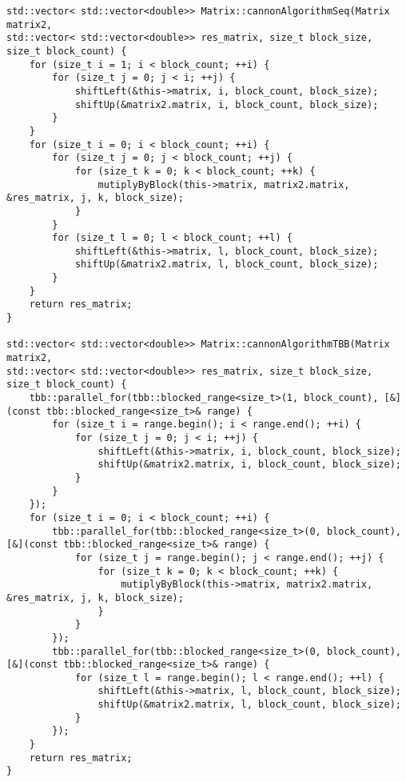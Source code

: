\documentclass{report}
\begin{document}
\begin{lstlisting}
std::vector< std::vector<double>> Matrix::cannonAlgorithmSeq(Matrix matrix2,
std::vector< std::vector<double>> res_matrix, size_t block_size,
size_t block_count) {
    for (size_t i = 1; i < block_count; ++i) {
        for (size_t j = 0; j < i; ++j) {
            shiftLeft(&this->matrix, i, block_count, block_size);
            shiftUp(&matrix2.matrix, i, block_count, block_size);
        }
    }
    for (size_t i = 0; i < block_count; ++i) {
        for (size_t j = 0; j < block_count; ++j) {
            for (size_t k = 0; k < block_count; ++k) {
                mutiplyByBlock(this->matrix, matrix2.matrix, &res_matrix, j, k, block_size);
            }
        }
        for (size_t l = 0; l < block_count; ++l) {
            shiftLeft(&this->matrix, l, block_count, block_size);
            shiftUp(&matrix2.matrix, l, block_count, block_size);
        }
    }
    return res_matrix;
}

std::vector< std::vector<double>> Matrix::cannonAlgorithmTBB(Matrix matrix2,
std::vector< std::vector<double>> res_matrix, size_t block_size,
size_t block_count) {
    tbb::parallel_for(tbb::blocked_range<size_t>(1, block_count), [&](const tbb::blocked_range<size_t>& range) {
        for (size_t i = range.begin(); i < range.end(); ++i) {
            for (size_t j = 0; j < i; ++j) {
                shiftLeft(&this->matrix, i, block_count, block_size);
                shiftUp(&matrix2.matrix, i, block_count, block_size);
            }
        }
    });
    for (size_t i = 0; i < block_count; ++i) {
        tbb::parallel_for(tbb::blocked_range<size_t>(0, block_count), [&](const tbb::blocked_range<size_t>& range) {
            for (size_t j = range.begin(); j < range.end(); ++j) {
                for (size_t k = 0; k < block_count; ++k) {
                    mutiplyByBlock(this->matrix, matrix2.matrix, &res_matrix, j, k, block_size);
                }
            }
        });
        tbb::parallel_for(tbb::blocked_range<size_t>(0, block_count), [&](const tbb::blocked_range<size_t>& range) {
            for (size_t l = range.begin(); l < range.end(); ++l) {
                shiftLeft(&this->matrix, l, block_count, block_size);
                shiftUp(&matrix2.matrix, l, block_count, block_size);
            }
        });
    }
    return res_matrix;
}
\end{lstlisting}
\end{document}
